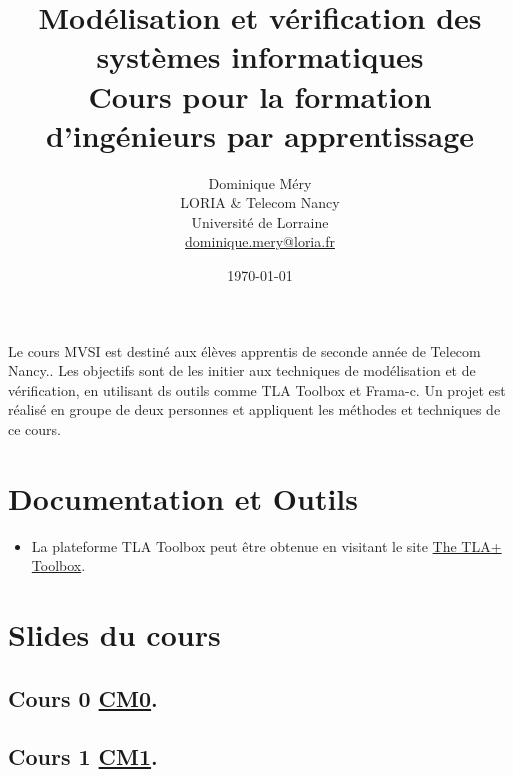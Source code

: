 \documentclass[ 12pt]{article}
\title{Modélisation et vérification des systèmes informatiques\\
Cours  pour la formation d'ingénieurs par apprentissage}
\author{Dominique M\'ery\\
LORIA \& Telecom Nancy\\ Universit\'e de Lorraine\\ \url{dominique.mery@loria.fr}}
\date{\today}
\begin{document}
\begin{tcolorbox}



  \setcounter{ex}{1}
\maketitle

Le cours MVSI  est destiné aux élèves apprentis de seconde année  de
Telecom Nancy..
Les objectifs sont de les initier aux techniques de modélisation et
de vérification, en utilisant ds outils comme TLA Toolbox et Frama-c.
Un projet est réalisé  en groupe de deux personnes et appliquent  les
méthodes  et techniques de ce cours.



  \tableofcontents

\section{Documentation et Outils}




\begin{itemize}

  
\item La plateforme TLA Toolbox peut être  obtenue en visitant le site  \href{https://lamport.azurewebsites.net/tla/toolbox.html}{The TLA+ Toolbox}.


  
\end{itemize}


\section{Slides du cours}
\label{sec:course-mcfsi-at}




\subsection{Cours 0
  \href{http://mery54.github.io/teaching/mvsi/lecturesnotes/mvsilecture0.pdf}{CM0}. }




\subsection{Cours 1
  \href{http://mery54.github.io/teaching/mvsi/lecturesnotes/mvsilecture1.pdf}{CM1}. }



\end{tcolorbox}
\end{document}
